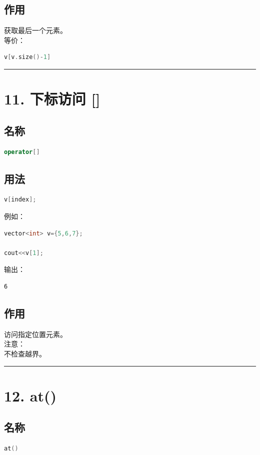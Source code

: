 \documentclass[10pt,twocolumn]{extarticle}
\begin{document}
\subsection{作用}
获取最后一个元素。\\
等价：
\begin{lstlisting}[language=C++]
v[v.size()-1]
\end{lstlisting}

\noindent\rule{\linewidth}{0.4pt}

\section{11. 下标访问 []}

\subsection{名称}
\begin{lstlisting}[language=C++]
operator[]
\end{lstlisting}

\subsection{用法}
\begin{lstlisting}[language=C++]
v[index];
\end{lstlisting}
例如：
\begin{lstlisting}[language=C++]
vector<int> v={5,6,7};

cout<<v[1];
\end{lstlisting}
输出：
\begin{lstlisting}
6
\end{lstlisting}

\subsection{作用}
访问指定位置元素。\\
注意：\\
不检查越界。

\noindent\rule{\linewidth}{0.4pt}

\section{12. at()}

\subsection{名称}
\begin{lstlisting}[language=C++]
at()
\end{lstlisting}
\end{document}
